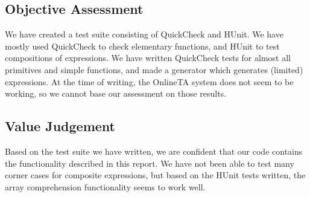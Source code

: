 \documentclass{article}
\begin{document}
\subsection{Objective Assessment}
We have created a test suite consisting of QuickCheck and HUnit. We have mostly used QuickCheck to check elementary functions, and HUnit to test compositions of expressions. We have written QuickCheck tests for almost all primitives and simple functions, and made a generator which generates (limited) expressions. At the time of writing, the OnlineTA system does not seem to be working, so we cannot base our assessment on those results.

\subsection{Value Judgement}
Based on the test suite we have written, we are confident that our code contains the functionality described in this report. We have not been able to test many corner cases for composite expressions, but based on the HUnit tests written, the array comprehension functionality seems to work well.
\end{document}
